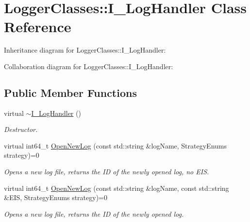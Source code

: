 \hypertarget{classLoggerClasses_1_1I__LogHandler}{}\section{Logger\+Classes\+::I\+\_\+\+Log\+Handler Class Reference}
\label{classLoggerClasses_1_1I__LogHandler}


Inheritance diagram for Logger\+Classes\+::I\+\_\+\+Log\+Handler\+:


Collaboration diagram for Logger\+Classes\+::I\+\_\+\+Log\+Handler\+:
\subsection*{Public Member Functions}
\begin{DoxyCompactItemize}
\item 
\mbox{\label{classLoggerClasses_1_1I__LogHandler_a9ae4eb6f2fca740fcff14e3ecea4c894}} 
virtual \mbox{\hyperlink{classLoggerClasses_1_1I__LogHandler_a9ae4eb6f2fca740fcff14e3ecea4c894}{$\sim$\+I\+\_\+\+Log\+Handler}} ()
\begin{DoxyCompactList}\small\item\em Destructor. \end{DoxyCompactList}\item 
\mbox{\label{classLoggerClasses_1_1I__LogHandler_af3f21c5055e10cd7be79264de3345eb4}} 
virtual int64\+\_\+t \mbox{\hyperlink{classLoggerClasses_1_1I__LogHandler_af3f21c5055e10cd7be79264de3345eb4}{Open\+New\+Log}} (const std\+::string \&log\+Name, Strategy\+Enums strategy)=0
\begin{DoxyCompactList}\small\item\em Opens a new log file, returns the ID of the newly opened log, no E\+IS. \end{DoxyCompactList}\item 
\mbox{\label{classLoggerClasses_1_1I__LogHandler_a88a8bfc5c328359e0512dcae76a4d806}} 
virtual int64\+\_\+t \mbox{\hyperlink{classLoggerClasses_1_1I__LogHandler_a88a8bfc5c328359e0512dcae76a4d806}{Open\+New\+Log}} (const std\+::string \&log\+Name, const std\+::string \&E\+IS, Strategy\+Enums strategy)=0
\begin{DoxyCompactList}\small\item\em Opens a new log file, returns the ID of the newly opened log. \end{DoxyCompactList}\item 

\end{DoxyCompactItemize}
